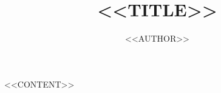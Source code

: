 \documentclass[10pt]{ltjtarticle}
\title{<<TITLE>>}
\author{<<AUTHOR>>}
\date{} %
\begin{document}
\maketitle

<<CONTENT>>
\end{document}
